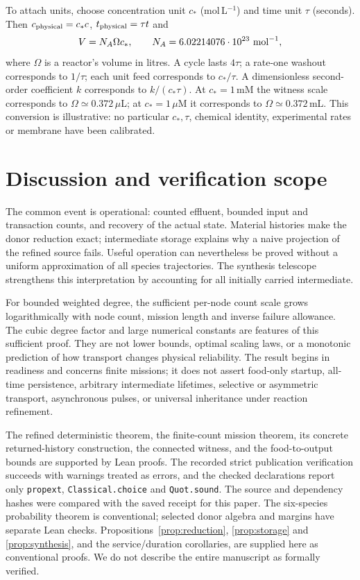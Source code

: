 \documentclass[11pt]{article}
\theoremstyle{definition}\newtheorem{definition}[theorem]{Definition}
\begin{document}
To attach units, choose concentration unit $c_*$ (mol\,L$^{-1}$) and time unit
$\tau$ (seconds). Then $c_{\rm physical}=c_*c$, $t_{\rm physical}=\tau t$ and
\[
V=N_A\Omega c_*,\qquad N_A=6.02214076\cdot10^{23}\ {\rm mol}^{-1},
\]
where $\Omega$ is a reactor's volume in litres. A cycle lasts $4\tau$; a rate-one
washout corresponds to $1/\tau$; each unit feed corresponds to $c_*/\tau$.
A dimensionless second-order coefficient $k$ corresponds to $k/(c_*\tau)$.
At $c_*=1$\,mM the witness scale corresponds to $\Omega\simeq0.372$\,$\mu$L;
at $c_*=1$\,$\mu$M it corresponds to $\Omega\simeq0.372$\,mL.
This conversion is illustrative: no particular $c_*,\tau$, chemical identity,
experimental rates or membrane have been calibrated.

\section{Discussion and verification scope}
The common event is operational: counted effluent, bounded input and transaction
counts, and recovery of the actual state. Material histories make the donor reduction
exact; intermediate storage explains why a naive projection of the refined source
fails. Useful operation can nevertheless be proved without a uniform approximation
of all species trajectories. The synthesis telescope strengthens this interpretation
by accounting for all initially carried intermediate.

For bounded weighted degree, the sufficient per-node count scale grows logarithmically
with node count, mission length and inverse failure allowance. The cubic degree factor
and large numerical constants are features of this sufficient proof. They are not
lower bounds, optimal scaling laws, or a monotonic prediction of how transport changes
physical reliability. The result begins in readiness and concerns finite missions;
it does not assert food-only startup, all-time persistence, arbitrary intermediate
lifetimes, selective or asymmetric transport, asynchronous pulses, or universal
inheritance under reaction refinement.

The refined deterministic theorem, the finite-count mission theorem, its concrete
returned-history construction, the connected witness, and the food-to-output bounds
are supported by Lean proofs. The recorded strict publication verification succeeds
with warnings treated as errors, and the checked declarations report only
\texttt{propext}, \texttt{Classical.choice} and \texttt{Quot.sound}.
The source and dependency hashes were compared with the saved receipt for this paper.
The six-species probability theorem is conventional; selected donor algebra and margins
have separate Lean checks. Propositions~\ref{prop:reduction}, \ref{prop:storage} and
\ref{prop:synthesis}, and the service/duration corollaries, are supplied here as
conventional proofs. We do not describe the entire manuscript as formally verified.
\end{document}
